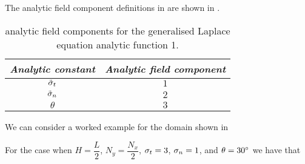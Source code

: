 The analytic field component definitions in \OpenCMISS are shown in
.

\begin{table}[htb] \centering
  \begin{tabular}{|c|c|} \hline
    \emph{Analytic constant} & \emph{Analytic field component} \\ \hline \hline
    $\tilde{ \sigma }_{t}$ & $1$ \\ 
    $\tilde{ \sigma }_{n}$ & $2$ \\
    $\theta$ & $3$ \\ \hline
  \end{tabular}
  \caption{\OpenCMISS analytic field components for the \twod generalised Laplace equation
    analytic function 1.}
  \label{tab:OpenCMISSAnalyticFieldGeneralisedLaplaceEquationTwoDim1}
\end{table}

We can consider a worked example for the domain shown in 


For the case when $H=\dfrac{L}{2}$, $N_{y}=\dfrac{N_{x}}{2}$, $ \sigma _{t}=3$, $ \sigma _{n}=1$, and $\theta=30^{\circ}$ we have that

